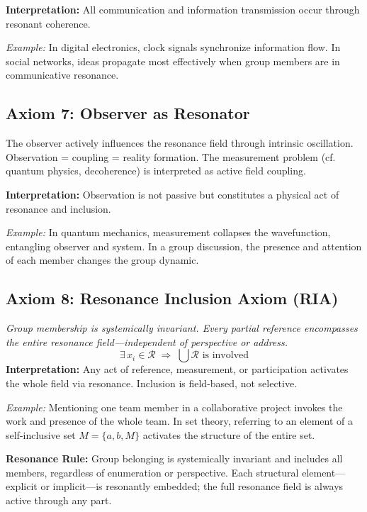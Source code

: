\documentclass[12pt]{article}
\begin{document}
\textbf{Interpretation:} All communication and information transmission occur through resonant coherence.

\textit{Example:} In digital electronics, clock signals synchronize information flow. In social networks, ideas propagate most effectively when group members are in communicative resonance.

\subsection{Axiom 7: Observer as Resonator}
The observer actively influences the resonance field through intrinsic oscillation. Observation = coupling = reality formation. The measurement problem (cf. quantum physics, decoherence) is interpreted as active field coupling.

\textbf{Interpretation:} Observation is not passive but constitutes a physical act of resonance and inclusion.

\textit{Example:} In quantum mechanics, measurement collapses the wavefunction, entangling observer and system. In a group discussion, the presence and attention of each member changes the group dynamic.

\subsection{Axiom 8: Resonance Inclusion Axiom (RIA)}
\textit{Group membership is systemically invariant. Every partial reference encompasses the entire resonance field—independent of perspective or address.}
\[
\exists\, x_i \in \mathcal{R} \;\Rightarrow\; \bigcup \mathcal{R} \text{ is involved}
\]
\textbf{Interpretation:} Any act of reference, measurement, or participation activates the whole field via resonance. Inclusion is field-based, not selective.

\textit{Example:} Mentioning one team member in a collaborative project invokes the work and presence of the whole team. In set theory, referring to an element of a self-inclusive set $M = \{a, b, M\}$ activates the structure of the entire set.

\medskip

\textbf{Resonance Rule:}  
Group belonging is systemically invariant and includes all members, regardless of enumeration or perspective. Each structural element—explicit or implicit—is resonantly embedded; the full resonance field is always active through any part.

\medskip
\end{document}
